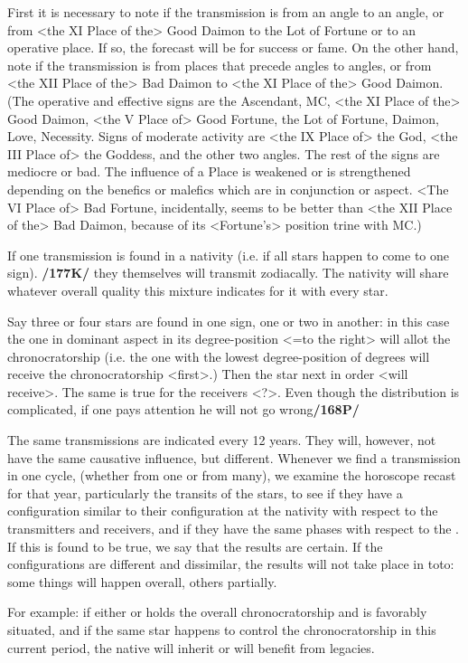 First it is necessary to note if the transmission is from an angle to an angle, or from <the XI Place of the> Good Daimon to the Lot of Fortune or to an operative place. If so, the forecast will be for success or fame. On the other hand, note if the transmission is from places that precede angles to angles, or from <the XII Place of the> Bad Daimon
to <the XI Place of the> Good Daimon. (The operative and effective signs are the Ascendant, MC, <the XI Place of the> Good Daimon, <the V Place of> Good Fortune, the Lot of Fortune, Daimon, Love, Necessity. Signs of moderate activity are <the IX Place of> the God, <the III Place of> the Goddess, and the other two angles. The rest of the signs are mediocre or bad. The influence of a Place is weakened or is strengthened depending on the benefics or malefics which are in conjunction or aspect. <The VI Place of> Bad Fortune, incidentally, seems to be better than <the XII Place of the> Bad Daimon, because of its <Fortune’s> position trine with MC.)

If one transmission is found in a nativity (i.e. if all stars happen to come to one sign). \textbf{/177K/} they themselves will transmit zodiacally. The nativity will share whatever overall quality this mixture indicates for it with every star. 

Say three or four stars are found in one sign, one or two in another: in this case the one in dominant aspect in its degree-position <=to the right> will allot the chronocratorship (i.e. the one with the lowest degree-position of degrees will receive the chronocratorship <first>.) Then the star next in order <will receive>. The same is true for the receivers <?>. Even though the distribution is complicated, if one pays attention he will not go wrong\textbf{/168P/}

The same transmissions are indicated every 12 years. They will, however, not have the same causative influence, but different. Whenever we find a transmission in one cycle, (whether from one or from many), we examine the horoscope recast for that year, particularly the transits of the stars, to see if they have a configuration similar to their configuration at the nativity with respect to the transmitters and receivers, and if they have the same phases with respect to the \Sun. If this is found to be true, we say that the results are certain. If the configurations are different and dissimilar, the results will not take place in toto: some things will happen overall, others partially. 

For example: if either \Jupiter\xspace or \Saturn\xspace holds the overall chronocratorship and is favorably situated, and if the same star happens to control the chronocratorship in this current period, the native will inherit or will benefit from legacies. 

